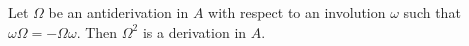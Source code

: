 Let $\Omega$ be an antiderivation in $A$ with respect to an involution $\omega$ such that $\omega \Omega = -\Omega \omega$. Then $\Omega^2$ is a derivation in $A$.
